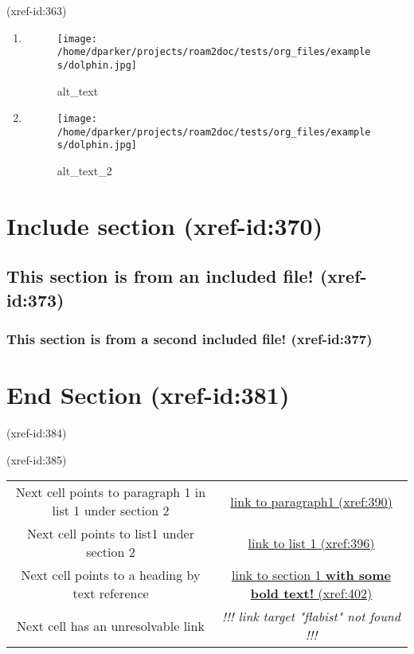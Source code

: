 \documentclass[11pt]{article}
\begin{document}
 (xref-id:363)
\begin{enumerate} \label{obj-363}
\item
\begin{figure} [ht]
\centering
\texttt{[image: /home/dparker/projects/roam2doc/tests/org\_files/examples/dolphin.jpg]}
\caption{alt\_text}
\end{figure}
\item
\begin{figure} [ht]
\centering
\texttt{[image: /home/dparker/projects/roam2doc/tests/org\_files/examples/dolphin.jpg]}
\caption{alt\_text\_2}
\end{figure}
\vspace{\baselineskip}
\end{enumerate}
\section{Include section   (xref-id:370)  }
 \label{obj-370}
 \label{obj-369}
\subsection{This section is from an included file!   (xref-id:373)  }
 \label{obj-373}
 \label{obj-372}
\vspace{\baselineskip}
\subsubsection{This section is from a second included file!   (xref-id:377)  }
 \label{obj-377}
 \label{obj-376}
\vspace{\baselineskip}
\section{End Section   (xref-id:381)  }
 \label{obj-381}
 \label{obj-380}
\label{obj-384} (xref-id:384)

 (xref-id:385)
 \label{obj-385}
\begin{tabular}{|c|c|}
\hline
 Next cell points to paragraph 1 in list 1 under section 2  & \hyperref[obj-50]{link to paragraph1 (xref:390)} \\
 Next cell points to list1 under section 2                  & \hyperref[obj-75]{link to list 1 (xref:396)} \\
 Next cell points to a heading by text reference            & \hyperref[obj-15]{link to section 1 \textbf{with some bold text!} (xref:402)} \\
 Next cell has an unresolvable link                         & \textit{!!! link target "flabist" not found !!!} \\
\hline
\end{tabular}
\vspace{\baselineskip}
\vspace{\baselineskip}
\printindex
\noindent
\end{document}
